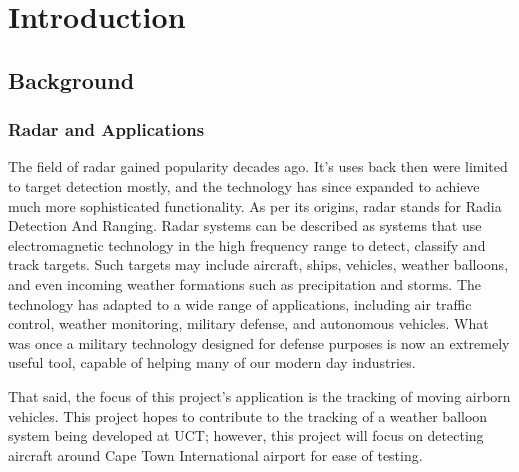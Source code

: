\chapter{Introduction}
\label{ch:introduction}
\section{Background}
\label{sec:ch1.background}
\subsection{Radar and Applications}
\label{subsec:ch1.section1.radarapplications}
The field of radar gained popularity decades ago. It's uses back then were limited to target detection mostly, and the technology has since expanded to achieve much more sophisticated functionality.
As per its origins, radar stands for Radia Detection And Ranging. Radar systems can be described as systems that use electromagnetic technology in the high frequency range to detect, classify and track targets.
Such targets may include aircraft, ships, vehicles, weather balloons, and even incoming weather formations such as precipitation and storms. The technology has adapted to a wide range of applications, including air traffic control, weather monitoring, military defense, and autonomous vehicles.
What was once a military technology designed for defense purposes is now an extremely useful tool, capable of helping many of our modern day industries.

That said, the focus of this project's application is the tracking of moving airborn vehicles. This project hopes to contribute to the tracking of a weather balloon system being developed at UCT; however, this project will focus on detecting aircraft around Cape Town International airport for ease of testing.

